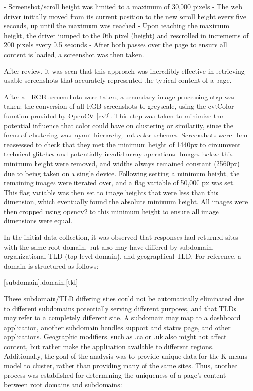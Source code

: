 - Screenshot/scroll height was limited to a maximum of 30,000 pixels
- The web driver initially moved from its current position to the new scroll height every five seconds, up until the maximum was reached
- Upon reaching the maximum height, the driver jumped to the 0th pixel (height) and rescrolled in increments of 200 pixels every 0.5 seconds
- After both passes over the page to ensure all content is loaded, a screenshot was then taken.

After review, it was seen that this approach was incredibly effective in retrieving usable screenshots that accurately represented the typical content of a page.

After all RGB screenshots were taken, a secondary image processing step was taken: the conversion of all RGB screenshots to greyscale, using the cvtColor function provided by OpenCV [cv2]. This step was taken to minimize the potential influence that color could have on clustering or similarity, since the focus of clustering was layout hierarchy, not color schemes. 
Screenshots were then reassessed to check that they met the minimum height of 1440px to circumvent technical glitches and potentially invalid array operations. Images below this minimum height were removed, and widths always remained constant (2560px) due to being taken on a single device. Following setting a minimum height, the remaining images were iterated over, and a flag variable of 50,000 px was set. This flag variable was then set to image heights that were less than this dimension, which eventually found the absolute minimum height. All images were then cropped using opencv2 to this minimum height to ensure all image dimensions were equal.

In the initial data collection, it was observed that responses had returned sites with the same root domain, but also may have differed by subdomain, organizational TLD (top-level domain), and geographical TLD. For reference, a domain is structured as follows:

[subdomain].domain.[tld]

These subdomain/TLD differing sites could not be automatically eliminated due to different subdomains potentially serving different purposes, and that TLDs may refer to a completely different site. A subdomain may map to a dashboard application, another subdomain handles support and status page, and other applications. Geographic modifiers, such as .ca or .uk also might not affect content, but rather make the application available to different regions. Additionally, the goal of the analysis was to provide unique data for the K-means model to cluster, rather than providing many of the same sites. Thus, another process was established for determining the uniqueness of a page's content between root domains and subdomains:

